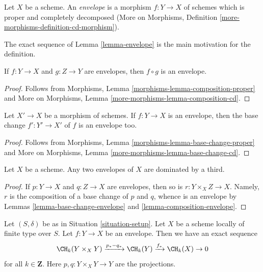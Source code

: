 \begin{definition}
\label{definition-envelope}
\begin{reference}
\cite[Definition 18.3]{F}
\end{reference}
Let $X$ be a scheme. An {\it envelope} is a morphism $f : Y \to X$
of schemes which is proper and completely decomposed
(More on Morphisms, Definition \ref{more-morphisms-definition-cd-morphism}).
\end{definition}

\noindent
The exact sequence of Lemma \ref{lemma-envelope}
is the main motivation for the definition.

\begin{lemma}
\label{lemma-composition-envelope}
If $f : Y \to X$ and $g : Z \to Y$ are envelopes, then
$f \circ g$ is an envelope.
\end{lemma}

\begin{proof}
Follows from Morphisms, Lemma \ref{morphisms-lemma-composition-proper}
and More on Morphisms, Lemma \ref{more-morphisms-lemma-composition-cd}.
\end{proof}

\begin{lemma}
\label{lemma-base-change-envelope}
Let $X' \to X$ be a morphism of schemes. If $f : Y \to X$ is an envelope,
then the base change $f' : Y' \to X'$ of $f$ is an envelope too.
\end{lemma}

\begin{proof}
Follows from Morphisms, Lemma \ref{morphisms-lemma-base-change-proper}
and More on Morphisms, Lemma \ref{more-morphisms-lemma-base-change-cd}.
\end{proof}

\begin{lemma}
\label{lemma-category-envelopes}
Let $X$ be a scheme. Any two envelopes of $X$ are dominated by a third.
\end{lemma}

\begin{proof}
If $p : Y \to X$ and $q : Z \to X$ are envelopes, then
so is $r : Y \times_X Z \to X$. Namely, $r$ is the composition
of a base change of $p$ and $q$, whence is an envelope
by Lemmas \ref{lemma-base-change-envelope} and
\ref{lemma-composition-envelope}.
\end{proof}

\begin{lemma}
\label{lemma-envelope}
Let $(S, \delta)$ be as in Situation \ref{situation-setup}.
Let $X$ be a scheme locally of finite type over $S$.
Let $f : Y \to X$ be an envelope. Then
we have an exact sequence
$$
\CH_k(Y \times_X Y) \xrightarrow{p_* - q_*}
\CH_k(Y) \xrightarrow{f_*}
\CH_k(X) \to 0
$$
for all $k \in \mathbf{Z}$. Here $p, q : Y \times_X Y \to Y$ are
the projections.
\end{lemma}

